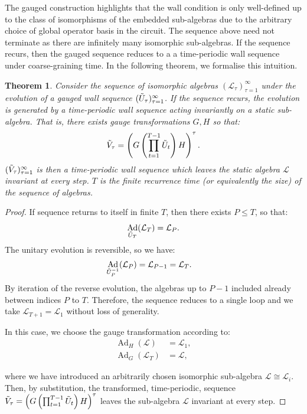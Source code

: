 \documentclass[11pt, twocolumn, floatfix, superscriptaddress, aps, prb, raggedbottom]{revtex4-2}
\newtheorem{theorem}{Theorem}[section]
\DeclareMathOperator{\Ad}{Ad}
\begin{document}
The gauged construction highlights that the wall condition is only well-defined up to the class of isomorphisms of the embedded sub-algebras due to the arbitrary choice of global operator basis in the circuit. The sequence above need not terminate as there are infinitely many isomorphic sub-algebras. If the sequence recurs, then the gauged sequence reduces to a a time-periodic wall sequence under coarse-graining time. In the following theorem, we formalise this intuition.
\begin{theorem}
    Consider the sequence of isomorphic algebras $(\mathcal{L}_{\tau})_{\tau=1}^{\infty}$ under the evolution of a gauged wall sequence $(\Tilde{U}_{\tau})_{\tau = 1}^{\infty}$. If the sequence recurs, the evolution is generated by a time-periodic wall sequence acting invariantly on a static sub-algebra. That is, there exists gauge transformations $G, H$ so that:
    \begin{equation}
        \Tilde{V}_{\tau} = \left( G \left (\prod_{t=1}^{T-1}    \Tilde{U}_t\right)H \right)^{\tau}.
    \end{equation}
    $(\Tilde{V}_{\tau})_{\tau=1}^{\infty}$ is then a time-periodic wall sequence which leaves the static algebra $\mathcal{L}$ invariant at every step. $T$ is the finite recurrence time (or equivalently the size) of the sequence of algebras.
\end{theorem}
\begin{proof}
If sequence returns to itself in finite $T$, then there exists $ P\leq T $, so that:
    \begin{equation}
        \Ad_{\Tilde{U}_{T}}(\mathcal{L}_T) = \mathcal{L}_P.
    \end{equation}
The unitary evolution is reversible, so we have: 
\begin{align}
    \Ad_{\Tilde{U}^{-1}_{P}}(\mathcal{L}_P) &= \mathcal{L}_{P-1}  = \mathcal{L}_T.
\end{align}
By iteration of the reverse evolution, the algebras up to $P-1$ included already between indices $P$ to $T$. Therefore, the sequence reduces to a single loop and we take $\mathcal{L}_{T+1} = \mathcal{L}_1$ without loss of generality.

In this case, we choose the gauge transformation according to:
\begin{align}
    \Ad_H (\mathcal{L}) &= \mathcal{L}_1, \\
    \Ad_G (\mathcal{L}_T) &= \mathcal{L}, 
\end{align}

\noindent where we have introduced an arbitrarily chosen isomorphic sub-algebra $\mathcal{L} \cong \mathcal{L}_i$. Then, by substitution, the transformed, time-periodic, sequence $\Tilde{V}_{\tau} = \left( G \left (\prod_{t=1}^{T-1}    \Tilde{U}_t\right)H \right)^{\tau}$ leaves the sub-algebra $\mathcal{L}$ invariant at every step. 
\end{proof}
\end{document}
